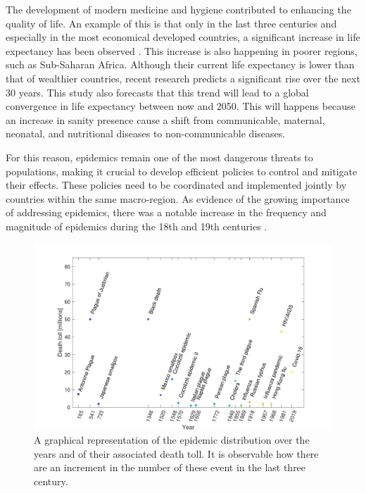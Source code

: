 The development of modern medicine and hygiene contributed to enhancing the quality of life. An example of this is that only in the last three centuries and especially in the most economical developed countries, a significant increase in life expectancy has been observed \cite{Anderson_82}.
This increase is also happening in poorer regions, such as Sub-Saharan Africa. Although their current life expectancy is lower than that of wealthier countries, recent research \cite{Vollset_2024} predicts a significant rise over the next 30 years. This study also forecasts that this trend will lead to a global convergence in life expectancy between now and 2050. This will happens because an increase in sanity presence cause a shift from communicable, maternal, neonatal, and nutritional diseases to non-communicable diseases.

For this reason, epidemics remain one of the most dangerous threats to populations, making it crucial to develop efficient policies to control and mitigate their effects. These policies need to be coordinated and implemented jointly by countries within the same macro-region. As evidence of the growing importance of addressing epidemics, there was a notable increase in the frequency and magnitude of epidemics during the 18th and 19th centuries \cite{Anderson_82}.

\begin{figure}[h]
	\centering
	\includegraphics[width=0.85\linewidth]{0_introduction/images_introduction/worst_epidemic}
	\caption[Epidemic distribution in time]{A graphical representation of the epidemic distribution over the years and of their associated death toll. It is observable how there are an increment in the number of these event in the last three century.}
	\label{fig:worstepidemic}
\end{figure}

